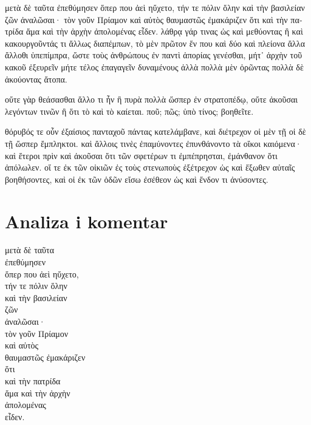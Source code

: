 {\large

\begin{greek}

\noindent μετὰ δὲ ταῦτα ἐπεθύμησεν ὅπερ που ἀεὶ ηὔχετο, τήν τε πόλιν ὅλην καὶ τὴν βασιλείαν ζῶν ἀναλῶσαι· τὸν γοῦν Πρίαμον καὶ αὐτὸς θαυμαστῶς ἐμακάριζεν ὅτι καὶ τὴν πατρίδα ἅμα καὶ τὴν ἀρχὴν ἀπολομένας εἶδεν. λάθρᾳ γάρ τινας ὡς καὶ μεθύοντας ἢ καὶ κακουργοῦντάς τι ἄλλως διαπέμπων, τὸ μὲν πρῶτον ἕν που καὶ δύο καὶ πλείονα ἄλλα ἄλλοθι ὑπεπίμπρα, ὥστε τοὺς ἀνθρώπους ἐν παντὶ ἀπορίας γενέσθαι, μήτ᾽ ἀρχὴν τοῦ κακοῦ ἐξευρεῖν μήτε τέλος ἐπαγαγεῖν δυναμένους ἀλλὰ πολλὰ μὲν ὁρῶντας πολλὰ δὲ ἀκούοντας ἄτοπα. 

\noindent οὔτε γὰρ θεάσασθαι ἄλλο τι ἦν ἢ πυρὰ πολλὰ ὥσπερ ἐν στρατοπέδῳ, οὔτε ἀκοῦσαι λεγόντων τινῶν ἢ ὅτι τὸ καὶ τὸ καίεται. ποῦ; πῶς; ὑπὸ τίνος; βοηθεῖτε.

\noindent θόρυβός τε οὖν ἐξαίσιος πανταχοῦ πάντας κατελάμβανε, καὶ διέτρεχον οἱ μὲν τῇ οἱ δὲ τῇ ὥσπερ ἔμπληκτοι. καὶ ἄλλοις τινὲς ἐπαμύνοντες ἐπυνθάνοντο τὰ οἴκοι καιόμενα· καὶ ἕτεροι πρὶν καὶ ἀκοῦσαι ὅτι τῶν σφετέρων τι ἐμπέπρησται, ἐμάνθανον ὅτι ἀπόλωλεν. οἵ τε ἐκ τῶν οἰκιῶν ἐς τοὺς στενωποὺς ἐξέτρεχον ὡς καὶ ἔξωθεν αὐταῖς βοηθήσοντες, καὶ οἱ ἐκ τῶν ὁδῶν εἴσω ἐσέθεον ὡς καὶ ἔνδον τι ἀνύσοντες.

\end{greek}

}


\section*{Analiza i komentar}


{\large
\begin{greek}
\noindent μετὰ δὲ ταῦτα \\
ἐπεθύμησεν \\
\tabto{2em} ὅπερ που ἀεὶ ηὔχετο, \\
τήν τε πόλιν ὅλην \\
καὶ τὴν βασιλείαν \\
ζῶν \\
\tabto{2em} ἀναλῶσαι· \\
τὸν γοῦν Πρίαμον \\
καὶ αὐτὸς \\
θαυμαστῶς ἐμακάριζεν \\
\tabto{2em} ὅτι \\
\tabto{4em} καὶ τὴν πατρίδα \\
\tabto{4em} ἅμα καὶ τὴν ἀρχὴν \\
\tabto{4em} ἀπολομένας \\
\tabto{4em} εἶδεν. \\

\end{greek}
}

